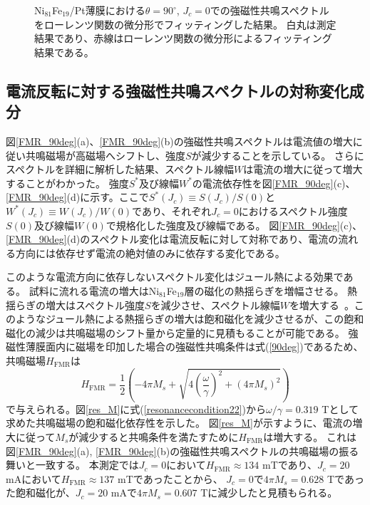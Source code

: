 \begin{figure}[tbp]
 \begin{center}
 \caption{Ni$_{81}$Fe$_{19}$/Pt薄膜における$\theta=90^\circ$, $J_c=0$での強磁性共鳴スペクトルをローレンツ関数の微分形でフィッティングした結果。
白丸は測定結果であり、赤線はローレンツ関数の微分形によるフィッティング結果である。}
 \label{FMR_fit}
 \end{center}
\end{figure}





\subsection{電流反転に対する強磁性共鳴スペクトルの対称変化成分}


図\ref{FMR_90deg}(a)、\ref{FMR_90deg}(b)の強磁性共鳴スペクトルは電流値の増大に従い共鳴磁場が高磁場へシフトし、強度$S$が減少することを示している。
さらにスペクトルを詳細に解析した結果、スペクトル線幅$W$は電流の増大に従って増大することがわかった。
強度$S^*$及び線幅$W^*$の電流依存性を図\ref{FMR_90deg}(c)、\ref{FMR_90deg}(d)に示す。ここで$S^*(J_c)\equiv S(J_c)/S(0)$と
$W^*(J_c)\equiv W(J_c)/W(0)$であり、それぞれ$J_c=0$におけるスペクトル強度$S(0)$及び線幅$W(0)$で規格化した強度及び線幅である。
図\ref{FMR_90deg}(c)、\ref{FMR_90deg}(d)のスペクトル変化は電流反転に対して対称であり、電流の流れる方向には依存せず電流の絶対値のみに依存する変化である。










このような電流方向に依存しないスペクトル変化はジュール熱による効果である。
試料に流れる電流の増大はNi$_{81}$Fe$_{19}$層の磁化の熱揺らぎを増幅させる。
熱揺らぎの増大はスペクトル強度$S$を減少させ、スペクトル線幅$W$を増大する~\cite{Bhagat}。このようなジュール熱による熱揺らぎの増大は飽和磁化を減少させるが、この飽和磁化の減少は共鳴磁場のシフト量から定量的に見積もることが可能である。
強磁性薄膜面内に磁場を印加した場合の強磁性共鳴条件は式(\ref{90deg})であるため、共鳴磁場$H_\text{FMR}$は
\begin{equation}
H_\text{FMR}=\frac{1}{2}\left( -4\pi M_s+\sqrt{4\left(\frac{\omega}{\gamma}\right)^2+(4\pi M_s)^2} \right) \label{resonancecondition22}
\end{equation}
で与えられる。図\ref{res_M}に式(\ref{resonancecondition22})から$\omega/\gamma=0.319$ Tとして求めた共鳴磁場の飽和磁化依存性を示した。
図\ref{res_M}が示すように、電流の増大に従って$M_s$が減少すると共鳴条件を満たすために$H_\text{FMR}$は増大する。
これは図\ref{FMR_90deg}(a), \ref{FMR_90deg}(b)の強磁性共鳴スペクトルの共鳴磁場の振る舞いと一致する。
本測定では$J_c=0$において$H_\text{FMR}\approx 134$ mTであり、$J_c=20$ mAにおいて$H_\text{FMR}\approx 137$ mTであったことから、
$J_c=0$で$4\pi M_s=0.628$ Tであった飽和磁化が、$J_c=20$ mAで$4\pi M_s=0.607$ Tに減少したと見積もられる。





